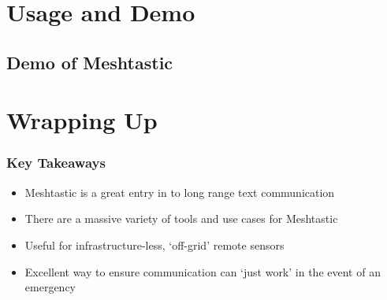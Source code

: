 \documentclass[aspectratio=169]{beamer}
\begin{document}
\section{Usage and Demo}
\subsection{Demo of Meshtastic}
\frame{\subsectionpage}

\section{Wrapping Up}
\frame{\sectionpage}

\begin{frame}
  \frametitle{Key Takeaways}
  \begin{itemize}[<+->]
    \item{Meshtastic is a great entry in to long range text communication}
    \item{There are a massive variety of tools and use cases for Meshtastic}
    \item{Useful for infrastructure-less, `off-grid' remote sensors}
    \item{Excellent way to ensure communication can `just work' in the event of an emergency}
  \end{itemize}
\end{frame}
\end{document}
